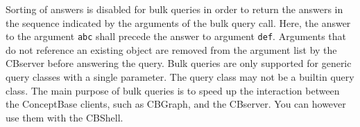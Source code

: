 Sorting of answers is disabled for bulk queries in order to return the answers in the sequence
indicated by the arguments of the bulk query call. Here, the answer to the argument {\tt abc}
shall precede the answer to argument {\tt def}. Arguments that do not reference an existing
object are removed from the argument list by the CBserver before answering the query.
Bulk queries are only supported for generic query classes with a single parameter.
The query class may not be a builtin query class.
%
The main purpose of bulk queries is to speed up the interaction between the ConceptBase clients,
such as CBGraph, and the CBserver. You can however use them with the CBShell.


